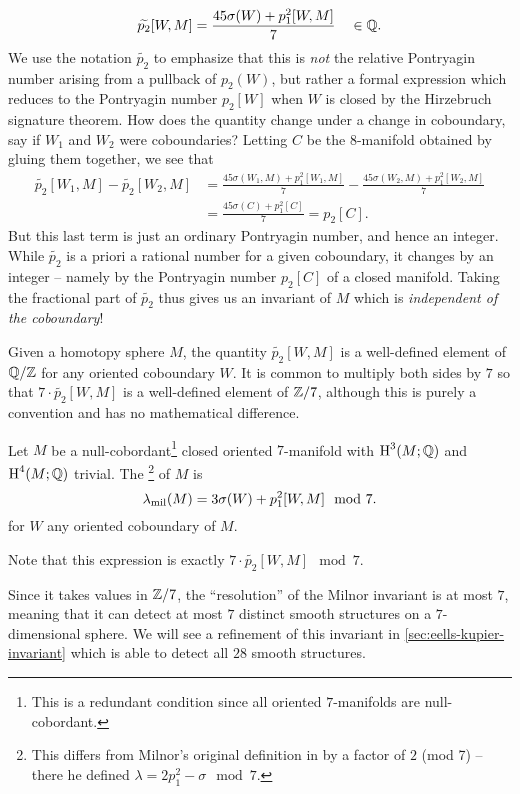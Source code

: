 \[
	\widetilde{p_2}[W, M] = \frac{45\sigma(W) + p_1^2[W, M]}{7} \quad\in\mathbb{Q}.
\]
We use the notation $\widetilde{p_2}$ to emphasize that this is \emph{not} the relative Pontryagin number arising from a pullback of $p_2(W)$, but rather a formal expression which reduces to the Pontryagin number $p_2[W]$ when $W$ is closed by the Hirzebruch signature theorem.
How does the quantity change under a change in coboundary, say if $W_1$ and $W_2$ were coboundaries? Letting $C$ be the $8$-manifold obtained by gluing them together, we see that
\[
	\begin{aligned}
		\widetilde{p_2}[W_1,M] - \widetilde{p_2}[W_2,M]
		 & = \frac{45\sigma(W_1,M) + p_1^2[W_1,M]}{7} - \frac{45\sigma(W_2, M) + p_1^2[W_2,M]}{7} \\
		 & =\frac{45\sigma(C) + p_1^2[C]}{7} = p_2[C].
	\end{aligned}
\]
But this last term is just an ordinary Pontryagin number, and hence an integer. While $\widetilde{p_2}$ is a priori a rational number for a given coboundary, it changes by an integer -- namely by the Pontryagin number $p_2[C]$ of a closed manifold.
Taking the fractional part of $\widetilde{p_2}$ thus gives us an invariant of $M$ which is \emph{independent of the coboundary}!

\begin{remark}
	Given a homotopy sphere $M$, the quantity $\widetilde{p_2}[W,M]$ is a well-defined element of $\mathbb{Q}/\mathbb{Z}$ for any oriented coboundary $W$. It is common to multiply both sides by $7$ so that $7\cdot \widetilde{p_2}[W,M]$ is a well-defined element of $\mathbb{Z}/7$, although this is purely a convention and has no mathematical difference.
\end{remark}

\begin{definition}\label{def:milnor-invariant-7}
	Let $M$ be a null-cobordant\footnote{This is a redundant condition since all oriented $7$-manifolds are null-cobordant.}
	closed oriented $7$-manifold with $\operatorname{H}^3(M; \mathbb{Q})$ and $\operatorname{H}^4(M; \mathbb{Q})$ trivial. The \footnote{This differs from Milnor's original definition in \cite{milnor1956manifolds} by a factor of $2$ (mod 7) -- there he defined $\lambda=2p_1^2-\sigma \mod 7$.} of $M$ is
	\[
		\lambda_{\mathrm{mil}}(M) = 3\sigma(W)+p_1^2[W,M]\mod 7.
	\]
	for $W$ any oriented coboundary of $M$.
\end{definition}

Note that this expression is exactly $7\cdot \widetilde{p_2}[W,M]\mod 7$.

\begin{remark}
	Since it takes values in $\mathbb{Z}/7$, the ``resolution'' of the Milnor invariant is at most $7$, meaning that it can detect at most $7$ distinct smooth structures on a $7$-dimensional sphere. We will see a refinement of this invariant in \cref{sec:eells-kupier-invariant} which is able to detect all $28$ smooth structures.
\end{remark}

